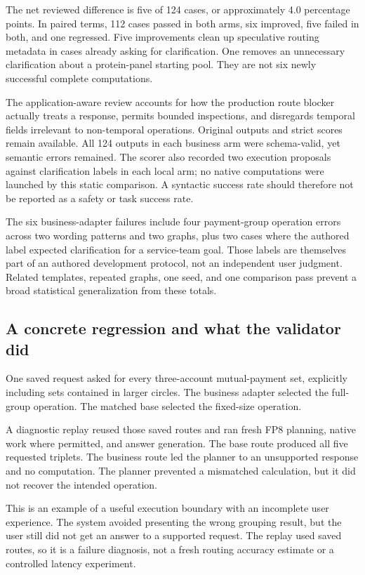 \documentclass[11pt,a4paper]{article}
\begin{document}
The net reviewed difference is five of 124 cases, or approximately 4.0 percentage
points. In paired terms, 112 cases passed in both arms, six improved, five failed
in both, and one regressed. Five improvements clean up speculative routing
metadata in cases already asking for clarification. One removes an unnecessary
clarification about a protein-panel starting pool. They are not six newly
successful complete computations.~\cite{businesseval,changeaudit}

The application-aware review accounts for how the production route blocker
actually treats a response, permits bounded inspections, and disregards temporal
fields irrelevant to non-temporal operations. Original outputs and strict scores
remain available. All 124 outputs in each business arm were schema-valid, yet
semantic errors remained. The scorer also recorded two execution proposals
against clarification labels in each local arm; no native computations were
launched by this static comparison. A syntactic success rate should therefore
not be reported as a safety or task success rate.

The six business-adapter failures include four payment-group operation errors
across two wording patterns and two graphs, plus two cases where the authored
label expected clarification for a service-team goal. Those labels are themselves
part of an authored development protocol, not an independent user judgment.
Related templates, repeated graphs, one seed, and one comparison pass prevent
a broad statistical generalization from these totals.

\subsection{A concrete regression and what the validator did}
\label{sec:regression}

One saved request asked for every three-account mutual-payment set, explicitly
including sets contained in larger circles. The business adapter selected the
full-group operation. The matched base selected the fixed-size operation.

A diagnostic replay reused those saved routes and ran fresh FP8 planning,
native work where permitted, and answer generation. The base route produced
all five requested triplets. The business route led the planner to an unsupported
response and no computation. The planner prevented a mismatched calculation,
but it did not recover the intended operation.~\cite{regression}

This is an example of a useful execution boundary with an incomplete user
experience. The system avoided presenting the wrong grouping result, but the
user still did not get an answer to a supported request. The replay used saved
routes, so it is a failure diagnosis, not a fresh routing accuracy estimate or
a controlled latency experiment.
\end{document}
